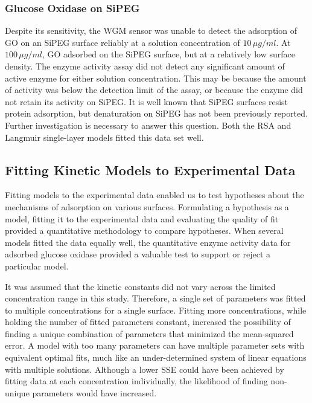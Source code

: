 \subsubsection{Glucose Oxidase on SiPEG}

Despite its sensitivity, the WGM sensor was unable to detect the adsorption
of GO on an SiPEG surface reliably at a solution concentration of
$10\,\mu g/ml$. At $100\,\mu g/ml$, GO adsorbed on the SiPEG surface,
but at a relatively low surface density. The enzyme activity assay
did not detect any significant amount of active enzyme for either
solution concentration. This may be because the amount of activity
was below the detection limit of the assay, or because the enzyme
did not retain its activity on SiPEG. It is well known that SiPEG
surfaces resist protein adsorption, but denaturation on SiPEG has
not been previously reported. Further investigation is necessary to
answer this question. Both the RSA and Langmuir single-layer models
fitted this data set well.


\subsection{Fitting Kinetic Models to Experimental Data}

Fitting models to the experimental data enabled us to test hypotheses
about the mechanisms of adsorption on various surfaces. Formulating
a hypothesis as a model, fitting it to the experimental data and evaluating
the quality of fit provided a quantitative methodology to compare
hypotheses. When several models fitted the data equally well, the
quantitative enzyme activity data for adsorbed glucose oxidase provided
a valuable test to support or reject a particular model. 

It was assumed that the kinetic constants did not vary across the
limited concentration range in this study. Therefore, a single set
of parameters was fitted to multiple concentrations for a single surface.
Fitting more concentrations, while holding the number of fitted parameters
constant, increased the possibility of finding a unique combination
of parameters that minimized the mean-squared error. A model with
too many parameters can have multiple parameter sets with equivalent
optimal fits, much like an under-determined system of linear equations
with multiple solutions. Although a lower SSE could have been achieved
by fitting data at each concentration individually, the likelihood
of finding non-unique parameters would have increased.

